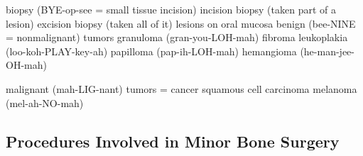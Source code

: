 \documentclass[
paper=landscape,
paper=160mm:90mm, %
fontsize=11pt, %
pagesize, %
parskip=half-, %
]{scrartcl} %
\theoremstyle{mythmstyle} %
\begin{document}
\clearpage
\begin{minipage}[c]{0.6\linewidth}

\begin{outline}
\1 biopsy (BYE-op-see = small tissue incision)
    \2 incision biopsy (taken part of a lesion)
    \2 excision biopsy (taken all of it)
\1 lesions on oral mucosa
    \2 benign (bee-NINE = nonmalignant) tumors
        \3 granuloma (gran-you-LOH-mah)
        \3 fibroma
        \3 leukoplakia (loo-koh-PLAY-key-ah)
        \3 papilloma (pap-ih-LOH-mah)
        \3 hemangioma (he-man-jee-OH-mah)

    \2 malignant (mah-LIG-nant) tumors = cancer
        \3 squamous cell carcinoma
        \3 melanoma (mel-ah-NO-mah)
\end{outline}
\end{minipage}
\begin{minipage}[c]{0.4\linewidth}

\end{minipage}


\clearpage

\subsection{Procedures Involved in Minor Bone Surgery}
\end{document}
